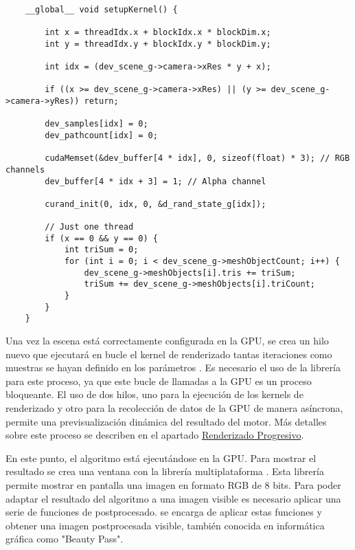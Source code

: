 \begin{minipage}[c]{0.95\textwidth}
\begin{lstlisting}[label={cod:setupkernel}, caption={Kernel de configuración inicial}]
	
	__global__ void setupKernel() {

		int x = threadIdx.x + blockIdx.x * blockDim.x;
		int y = threadIdx.y + blockIdx.y * blockDim.y;

		int idx = (dev_scene_g->camera->xRes * y + x);

		if ((x >= dev_scene_g->camera->xRes) || (y >= dev_scene_g->camera->yRes)) return;

		dev_samples[idx] = 0;
		dev_pathcount[idx] = 0;

		cudaMemset(&dev_buffer[4 * idx], 0, sizeof(float) * 3); // RGB channels
		dev_buffer[4 * idx + 3] = 1; // Alpha channel

		curand_init(0, idx, 0, &d_rand_state_g[idx]);

		// Just one thread
		if (x == 0 && y == 0) {
			int triSum = 0;
			for (int i = 0; i < dev_scene_g->meshObjectCount; i++) {
				dev_scene_g->meshObjects[i].tris += triSum;
				triSum += dev_scene_g->meshObjects[i].triCount;
			}
		}
	}
\end{lstlisting}
\end{minipage}

Una vez la escena está correctamente configurada en la GPU, se crea un hilo nuevo que ejecutará en bucle el kernel de renderizado tantas iteraciones como muestras se hayan definido en los parámetros . Es necesario el uso de la librería  para este proceso, ya que este bucle de llamadas a la GPU es un proceso bloqueante. El uso de dos hilos, uno para la ejecución de los kernels de renderizado y otro para la recolección de datos de la GPU de manera asíncrona, permite una previsualización dinámica del resultado del motor. Más detalles sobre este proceso se describen en el apartado \hyperref[progressiverender]{Renderizado Progresivo}.

En este punto, el algoritmo está ejecutándose en la GPU. Para mostrar el resultado se crea una ventana con la librería multiplataforma . Esta librería permite mostrar en pantalla una imagen en formato RGB de 8 bits. Para poder adaptar el resultado del algoritmo a una imagen visible es necesario aplicar una serie de funciones de postprocesado.  se encarga de aplicar estas funciones y obtener una imagen postprocesada visible, también conocida en informática gráfica como "Beauty Pass".

